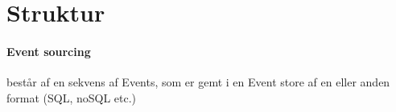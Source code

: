 \section{Struktur}

\paragraph{Event sourcing} består af en sekvens af Events, som er gemt i en Event store af en eller anden format (SQL, noSQL etc.) 